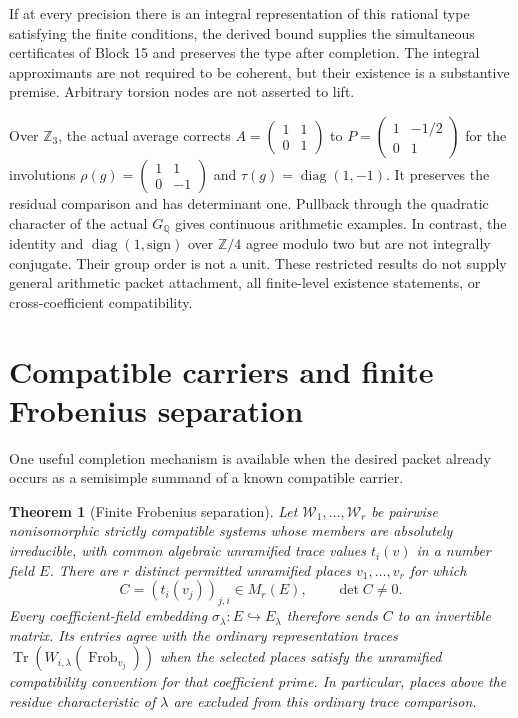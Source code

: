 \documentclass[11pt]{article}
\newtheorem{theorem}{Theorem}[section]
\theoremstyle{definition}
\theoremstyle{remark}
\begin{document}
If at every precision there is an integral representation of this rational
type satisfying the finite conditions, the derived bound supplies the
simultaneous certificates of Block 15 and preserves the type after completion.
The integral approximants are not required to be coherent, but their existence
is a substantive premise. Arbitrary torsion nodes are not asserted to lift.

Over $\mathbb Z_3$, the actual average corrects
$A=\left(\begin{smallmatrix}1&1\\0&1\end{smallmatrix}\right)$ to
$P=\left(\begin{smallmatrix}1&-1/2\\0&1\end{smallmatrix}\right)$ for the
involutions $\rho(g)=\left(\begin{smallmatrix}1&1\\0&-1\end{smallmatrix}\right)$
and $\tau(g)=\operatorname{diag}(1,-1)$. It preserves the residual comparison
and has determinant one. Pullback through the quadratic character of the
actual $G_{\mathbb Q}$ gives continuous arithmetic examples. In contrast, the
identity and $\operatorname{diag}(1,\mathrm{sign})$ over $\mathbb Z/4$ agree
modulo two but are not integrally conjugate. Their group order is not a unit.
These restricted results do not supply general arithmetic packet attachment,
all finite-level existence statements, or cross-coefficient compatibility.

\section{Compatible carriers and finite Frobenius separation}

One useful completion mechanism is available when the desired packet already occurs as a semisimple summand of a known compatible carrier.

\begin{theorem}[Finite Frobenius separation]
Let $\mathscr W_1,\ldots,\mathscr W_r$ be pairwise nonisomorphic strictly
compatible systems whose members are absolutely irreducible, with common
algebraic unramified trace values $t_i(v)$ in a number field $E$.
There are $r$ distinct permitted unramified places $v_1,\ldots,v_r$ for which
\[
 C=(t_i(v_j))_{j,i}\in M_r(E),\qquad \det C\ne0.
\]
Every coefficient-field embedding $\sigma_\lambda:E\hookrightarrow E_\lambda$
therefore sends $C$ to an invertible matrix. Its entries agree with the
ordinary representation traces
$\operatorname{Tr}(W_{i,\lambda}(\operatorname{Frob}_{v_j}))$
when the selected places satisfy the unramified compatibility convention
for that coefficient prime. In particular, places above the residue
characteristic of $\lambda$ are excluded from this ordinary trace comparison.
\end{theorem}
\end{document}
